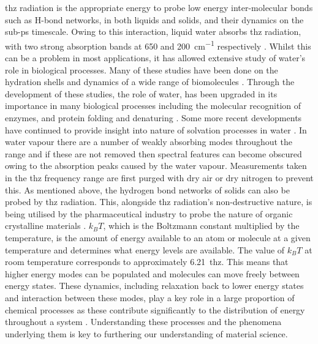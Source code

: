 \acrshort{thz} radiation is the appropriate energy to probe low energy inter\nobreakdash-molecular bonds such as H\nobreakdash-bond networks, in both liquids and solids, and their dynamics on the sub\nobreakdash-ps timescale. Owing to this interaction, liquid water absorbs \acrshort{thz} radiation, with two strong absorption bands at 650 and \SI{200}{cm^{-1}} respectively \DIFdelbegin \DIFdel{~}\DIFdelend \cite{Bellissent2016}. Whilst this can be a problem in most applications, it has allowed extensive study of water’s role in biological processes. Many of these studies have been done on the hydration shells and dynamics of a wide range of biomolecules \DIFdelbegin \DIFdel{~}\DIFdelend \cite{Laman2008}. Through the development of these studies, the role of water, has been upgraded in its importance in many biological processes including the molecular recognition of enzymes, and protein folding and denaturing \DIFdelbegin \DIFdel{~}\DIFdelend \cite{gompf2004}. Some more recent developments have continued to provide insight into nature of solvation processes in water \DIFdelbegin \DIFdel{~}\DIFdelend \cite{Stephens2022}. In water vapour there are a number of weakly absorbing modes throughout the  range \DIFdelbegin \DIFdel{~}\DIFdelend \cite{Slocum2013} and if these are not removed then spectral features can become obscured owing to the absorption peaks caused by the water vapour. Measurements taken in the \acrshort{thz} frequency range are first purged with dry air or dry nitrogen to prevent this. As mentioned above, the hydrogen bond networks of solids can also be probed by \acrshort{thz} radiation. This, alongside \acrshort{thz} radiation’s non\nobreakdash-destructive nature, is being utilised by the pharmaceutical industry to probe the nature of organic crystalline materials \DIFdelbegin \DIFdel{~}\DIFdelend \cite{Zhao2018}. 
\(k_BT\), which is the Boltzmann constant multiplied by the temperature, is the amount of energy available to an atom or molecule at a given temperature and determines what energy levels are available. The value of \(k_BT\) at room temperature corresponds to approximately \SI{6.21}{\acrshort{thz}}. This means that higher energy modes can be populated and molecules can move freely between energy states. These dynamics, including relaxation back to lower energy states and interaction between these modes, play a key role in a large proportion of chemical processes as these contribute significantly to the distribution of energy throughout a system \DIFdelbegin \DIFdel{~}\DIFdelend \cite{Ruggiero2016, Fujisaki2005}. Understanding these processes and the phenomena underlying them is key to furthering our understanding of material science. 

